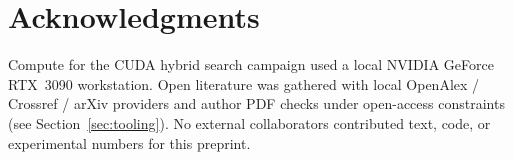 \section*{Acknowledgments}
\label{sec:acknowledgments}

Compute for the CUDA hybrid search campaign used a local NVIDIA GeForce RTX~3090 workstation.
Open literature was gathered with local OpenAlex / Crossref / arXiv providers and author PDF checks under open-access constraints (see Section~\ref{sec:tooling}).
No external collaborators contributed text, code, or experimental numbers for this preprint.
